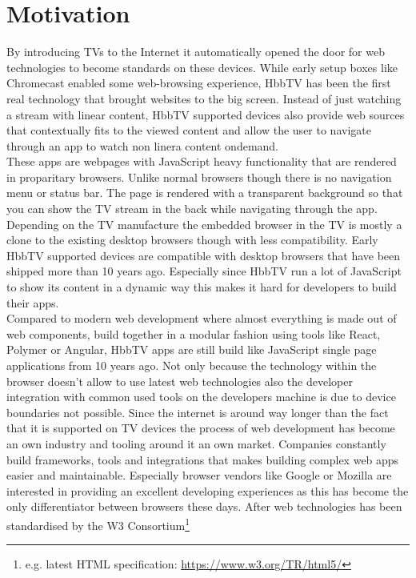 \section{Motivation\label{sec:motivation}}

By introducing TVs to the Internet it automatically opened the door for web technologies to become standards
on these devices. While early setup boxes like Chromecast enabled some web-browsing experience, HbbTV has
been the first real technology that brought websites to the big screen. Instead of just watching a stream with
linear content, HbbTV supported devices also provide web sources that contextually fits to the viewed content
and allow the user to navigate through an app to watch non linera content ondemand.\\
These apps are webpages with JavaScript heavy functionality that are rendered in proparitary browsers. Unlike
normal browsers though there is no navigation menu or status bar. The page is rendered with a transparent background
so that you can show the TV stream in the back while navigating through the app. Depending on the TV manufacture
the embedded browser in the TV is mostly a clone to the existing desktop browsers though with less compatibility.
Early HbbTV supported devices are compatible with desktop browsers that have been shipped more than 10 years ago.
Especially since HbbTV run a lot of JavaScript to show its content in a dynamic way this makes it hard for
developers to build their apps.\\
Compared to modern web development where almost everything is made out of web components, build together in a
modular fashion using tools like React, Polymer or Angular, HbbTV apps are still build like JavaScript single
page applications from 10 years ago. Not only because the technology within the browser doesn't allow to use
latest web technologies also the developer integration with common used tools on the developers machine is due
to device boundaries not possible. Since the internet is around way longer than the fact that it is supported on
TV devices the process of web development has become an own industry and tooling around it an own market.
Companies constantly build frameworks, tools and integrations that makes building complex web apps easier and
maintainable. Especially browser vendors like Google or Mozilla are interested in providing an excellent
developing experiences as this has become the only differentiator between browsers these days. After web
technologies has been standardised by the W3 Consortium\footnote{e.g. latest HTML specification: \url{https://www.w3.org/TR/html5/}}
